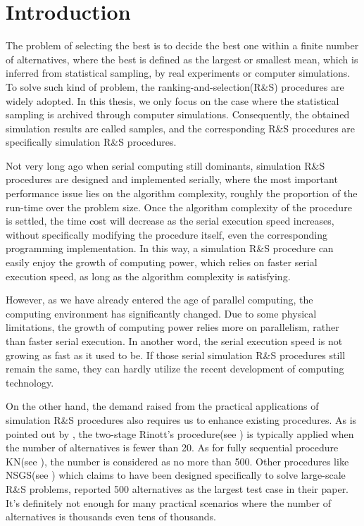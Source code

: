 \chapter{Introduction}

The problem of selecting the best is to decide the best one within a finite number of alternatives, where the best is defined as the largest or smallest mean, which is inferred from statistical sampling, by real experiments or computer simulations. To solve such kind of problem, the ranking-and-selection(R\&S) procedures are widely adopted. In this thesis, we only focus on the case where the statistical sampling is archived through computer simulations. Consequently, the obtained simulation results are called samples, and the corresponding R\&S procedures are specifically simulation R\&S procedures.

Not very long ago when serial computing still dominants, simulation R\&S procedures are designed and implemented serially, where the most important performance issue lies on the algorithm complexity, roughly the proportion of the run-time over the problem size. Once the algorithm complexity of the procedure is settled, the time cost will decrease as the serial execution speed increases, without specifically modifying the procedure itself, even the corresponding programming implementation. In this way, a simulation R\&S procedure can easily enjoy the growth of computing power, which relies on faster serial execution speed, as long as the algorithm complexity is satisfying.

However, as we have already entered the age of parallel computing, the computing environment has significantly changed. Due to some physical limitations, the growth of computing power relies more on parallelism, rather than faster serial execution. In another word, the serial execution speed is not growing as fast as it used to be. If those serial simulation R\&S procedures still remain the same, they can hardly utilize the recent development of computing technology.

On the other hand, the demand raised from the practical applications of simulation R\&S procedures also requires us to enhance existing procedures. As is pointed out by \cite{ehiorams06ras}, the two-stage Rinott’s procedure(see \cite{cistam1978rinott}) is typically applied when the number of alternatives is fewer than 20. As for fully sequential procedure KN(see \cite{tomacs01kn}), the number is considered as no more than 500. Other procedures like NSGS(see \cite{or01nsgs}) which claims to have been designed specifically to solve large-scale R\&S problems, reported 500 alternatives as the largest test case in their paper. It's definitely not enough for many practical scenarios where the number of alternatives is thousands even tens of thousands.

